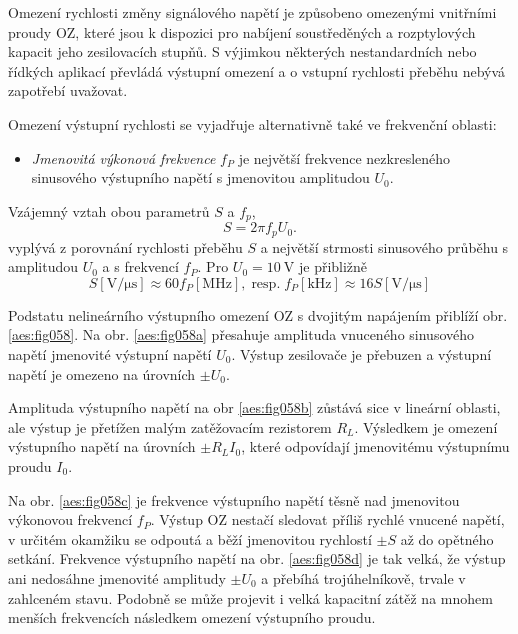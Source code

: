       Omezení rychlosti změny signálového napětí je způsobeno omezenými vnitřními proudy OZ, které
      jsou k dispozici pro nabíjení soustředěných a rozptylových kapacit jeho zesilovacích stupňů.
      S výjimkou některých nestandardních nebo řídkých aplikací převládá výstupní omezení a o
      vstupní rychlosti přeběhu nebývá zapotřebí uvažovat.

      Omezení výstupní rychlosti se vyjadřuje alternativně také ve frekvenční oblasti:
      \begin{itemize}[noitemsep]
        \item \emph{Jmenovitá výkonová frekvence} \(f_P\) je největší frekvence nezkresleného
              sinusového výstupního napětí s jmenovitou amplitudou \(U_0\).        
      \end{itemize}
      Vzájemný vztah obou parametrů \(S\) a \(f_p\),
      \begin{equation}\label{aes:eq038}
        S = 2\pi f_p U_0.
      \end{equation}
      vyplývá z porovnání rychlosti přeběhu \(S\) a největší strmosti sinusového průběhu s
      amplitudou \(U_0\) a s frekvencí \(f_P\). Pro \(U_0 = \SI{10}{\V}\) je přibližně
      \begin{equation*}
        S [\si{\V/\micro\s}] \approx 60f_P [\si{\mega\hertz}], \;\text{resp.}\; 
        f_P [\si{\kilo\hertz}] \approx 16 S [\si{\V/\micro\s}]
      \end{equation*}

      Podstatu nelineárního výstupního omezení OZ s dvojitým napájením přiblíží obr.
      \ref{aes:fig058}. Na obr. \ref{aes:fig058a} přesahuje amplituda vnuceného sinusového napětí
      jmenovité výstupní napětí \(U_0\). Výstup zesilovače je přebuzen a výstupní napětí je omezeno
      na úrovních \(\pm U_0\).

      Amplituda výstupního napětí na obr \ref{aes:fig058b} zůstává sice v lineární oblasti, ale
      výstup je přetížen malým zatěžovacím rezistorem \(R_L\). Výsledkem je omezení výstupního
      napětí na úrovních \(\pm R_LI_0\), které odpovídají jmenovitému výstupnímu proudu \(I_0\).

      Na obr. \ref{aes:fig058c} je frekvence výstupního napětí těsně nad jmenovitou výkonovou
      frekvencí \(f_P\). Výstup OZ nestačí sledovat příliš rychlé vnucené napětí, v určitém okamžiku
      se odpoutá a běží jmenovitou rychlostí \(\pm S\) až do opětného setkání. Frekvence výstupního
      napětí na obr. \ref{aes:fig058d} je tak velká, že výstup ani nedosáhne jmenovité amplitudy
      \(\pm U_0\) a přebíhá trojúhelníkově, trvale v zahlceném stavu. Podobně se může projevit i
      velká kapacitní zátěž na mnohem menších frekvencích následkem omezení výstupního proudu.

